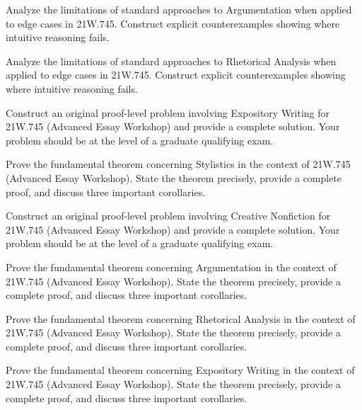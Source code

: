 \documentclass[12pt,a4paper]{exam}
\begin{document}
\begin{questions}

\question[3]
Analyze the limitations of standard approaches to Argumentation when applied to edge cases in 21W.745. Construct explicit counterexamples showing where intuitive reasoning fails.

\vspace{0.3cm}

\question[2]
Analyze the limitations of standard approaches to Rhetorical Analysis when applied to edge cases in 21W.745. Construct explicit counterexamples showing where intuitive reasoning fails.

\vspace{0.3cm}

\question[2]
Construct an original proof-level problem involving Expository Writing for 21W.745 (Advanced Essay Workshop) and provide a complete solution. Your problem should be at the level of a graduate qualifying exam.

\vspace{0.3cm}

\question[6]
Prove the fundamental theorem concerning Stylistics in the context of 21W.745 (Advanced Essay Workshop). State the theorem precisely, provide a complete proof, and discuss three important corollaries.

\vspace{0.3cm}

\question[3]
Construct an original proof-level problem involving Creative Nonfiction for 21W.745 (Advanced Essay Workshop) and provide a complete solution. Your problem should be at the level of a graduate qualifying exam.

\vspace{0.3cm}

\question[2]
Prove the fundamental theorem concerning Argumentation in the context of 21W.745 (Advanced Essay Workshop). State the theorem precisely, provide a complete proof, and discuss three important corollaries.

\vspace{0.3cm}

\question[3]
Prove the fundamental theorem concerning Rhetorical Analysis in the context of 21W.745 (Advanced Essay Workshop). State the theorem precisely, provide a complete proof, and discuss three important corollaries.

\vspace{0.3cm}

\question[6]
Prove the fundamental theorem concerning Expository Writing in the context of 21W.745 (Advanced Essay Workshop). State the theorem precisely, provide a complete proof, and discuss three important corollaries.


\end{questions}
\end{document}
